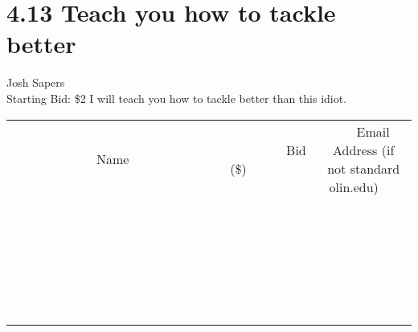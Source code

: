\documentclass[11pt]{article}
\begin{document}
\section*{4.13 Teach you how to tackle better}
Josh Sapers
\\
Starting Bid: \$2
\newline
I will teach you how to tackle better than this idiot.
\\[6ex]
\begin{tabular}{c c c}
~~~~~~~~~~~~~Name~~~~~~~~~~~~~ & ~~~~~~~~~Bid (\$)~~~~~~~~~  & ~~~Email Address (if not standard olin.edu)~~~\\
 & & \\
\hline
 & & \\
\hline
 & & \\
\hline
 & & \\
\hline
 & & \\
\hline
 & & \\
\hline
 & & \\
\hline
 & & \\
\hline
 & & \\
\hline
 & & \\
\hline
 & & \\
\hline
 & & \\
\hline
 & & \\
\hline
 & & \\
\hline
 & & \\
\hline
 & & \\
\hline
 & & \\
\hline
 & & \\
\hline
 & & \\
\hline
 & & \\
\hline
 & & \\
\hline
 & & \\
\hline
 & & \\
\hline
 & & \\
\hline
 & & \\
\hline
 & & \\
\hline
\end{tabular}
\newpage
\end{document}
